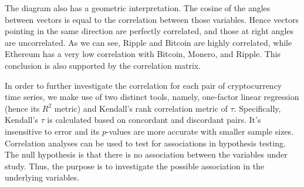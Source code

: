 \documentclass[12pt,twoside]{article}
\begin{document}
\bigbreak
The diagram also has a geometric interpretation. The cosine of the angles between vectors is equal to the correlation between those variables. Hence vectors pointing in the same direction are perfectly correlated, and those at right angles are uncorrelated. As we can see, Ripple and Bitcoin are highly correlated, while Ethereum has a very low correlation with Bitcoin, Monero, and Ripple. This conclusion is also supported by the correlation matrix.

\bigbreak

In order to further investigate the correlation for each pair of cryptocurrency time series, we make use of two distinct tools, namely, one-factor linear regression (hence its $R^2$ metric) and Kendall's rank correlation metric of $\tau$. Specifically, Kendall's $\tau$ is calculated based on concordant and discordant pairs. It's insensitive to error and its $p$-values are more accurate with smaller sample sizes. Correlation analyses can be used to test for associations in hypothesis testing.  The null hypothesis is that there is no association between the variables under study.  Thus, the purpose is to investigate the possible association in the underlying variables.
\bigbreak
\end{document}
